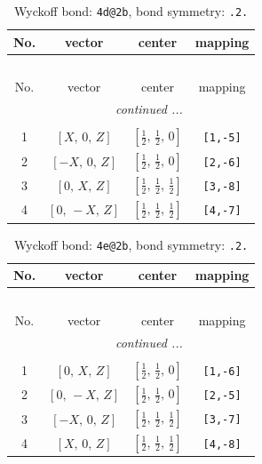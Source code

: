 \documentclass[fleqn,8pt]{jsarticle}
\begin{document}
\begin{longtable}{cccc}
\caption{Wyckoff bond: {\tt 4d@2b}, bond symmetry: {\tt .2.}}
 \\
 \hline \hline
No. & vector & center & mapping \\ \hline \endfirsthead

\multicolumn{3}{l}{\tablename\ \thetable{}} \\
 \hline \hline
No. & vector & center & mapping \\ \hline \endhead

 \hline \hline
\multicolumn{3}{r}{\footnotesize\it continued ...} \\ \endfoot

 \hline \hline
\multicolumn{3}{r}{} \\ \endlastfoot

1 & $\left[ X,\, 0,\, Z \right]$ & $\left[ \frac{1}{2},\, \frac{1}{2},\, 0 \right]$ & {\tt [1,-5]} \\ \hline
2 & $\left[ - X,\, 0,\, Z \right]$ & $\left[ \frac{1}{2},\, \frac{1}{2},\, 0 \right]$ & {\tt [2,-6]} \\ \hline
3 & $\left[ 0,\, X,\, Z \right]$ & $\left[ \frac{1}{2},\, \frac{1}{2},\, \frac{1}{2} \right]$ & {\tt [3,-8]} \\ \hline
4 & $\left[ 0,\, - X,\, Z \right]$ & $\left[ \frac{1}{2},\, \frac{1}{2},\, \frac{1}{2} \right]$ & {\tt [4,-7]} \\
\end{longtable}
\renewcommand{\arraystretch}{1.2}
\begin{longtable}{cccc}
\caption{Wyckoff bond: {\tt 4e@2b}, bond symmetry: {\tt .2.}}
 \\
 \hline \hline
No. & vector & center & mapping \\ \hline \endfirsthead

\multicolumn{3}{l}{\tablename\ \thetable{}} \\
 \hline \hline
No. & vector & center & mapping \\ \hline \endhead

 \hline \hline
\multicolumn{3}{r}{\footnotesize\it continued ...} \\ \endfoot

 \hline \hline
\multicolumn{3}{r}{} \\ \endlastfoot

1 & $\left[ 0,\, X,\, Z \right]$ & $\left[ \frac{1}{2},\, \frac{1}{2},\, 0 \right]$ & {\tt [1,-6]} \\ \hline
2 & $\left[ 0,\, - X,\, Z \right]$ & $\left[ \frac{1}{2},\, \frac{1}{2},\, 0 \right]$ & {\tt [2,-5]} \\ \hline
3 & $\left[ - X,\, 0,\, Z \right]$ & $\left[ \frac{1}{2},\, \frac{1}{2},\, \frac{1}{2} \right]$ & {\tt [3,-7]} \\ \hline
4 & $\left[ X,\, 0,\, Z \right]$ & $\left[ \frac{1}{2},\, \frac{1}{2},\, \frac{1}{2} \right]$ & {\tt [4,-8]} \\
\end{longtable}
\end{document}
